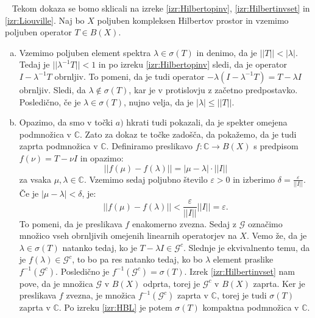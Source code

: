 \documentclass[12pt,a4paper,oneside,fleqn,openany]{book}
\newcommand{\eopf}{\raisebox{0.8ex}{\framebox{}}} %
\newenvironment{dokaz}%
{\noindent{\bf Dokaz.}\ }%
{\hfill\eopf\par\bigskip}%
\newcommand{\C}{\mathbb{C}}
\newcommand{\abs}[1]{\ensuremath{\lvert #1 \rvert}}
\newcommand{\norm}[1]{\abs{\abs{#1}}}
\newcommand{\map}[3]{\ensuremath{{#1}:{#2}\rightarrow{#3}}}
\begin{document}
\begin{dokaz}
	Tekom dokaza se bomo sklicali na izreke \ref{izr:Hilbertopinv}, \ref{izr:Hilbertinvset} in \ref{izr:Liouville}. Naj bo $X$ poljuben kompleksen Hilbertov prostor in vzemimo poljuben operator $T\in B(X)$.
	\begin{enumerate}[a)]
		\item Vzemimo poljuben element spektra $\lambda\in\sigma(T)$ in denimo, da je $\norm{T} < \abs{\lambda}$. Tedaj je $\norm{\lambda^{-1}T} < 1$ in po izreku \ref{izr:Hilbertopinv} sledi, da je operator $I - \lambda^{-1}T$ obrnljiv. To pomeni, da je tudi operator $-\lambda(I - \lambda^{-1}T)= T - \lambda I$ obrnljiv. Sledi, da $\lambda\notin\sigma(T)$, kar je v protislovju z začetno predpostavko. Posledično, če je $\lambda\in \sigma(T)$, nujno velja, da je $\abs{\lambda}\leq \norm{T}$.
		
		\item Opazimo, da smo v točki $a)$ hkrati tudi pokazali, da je spekter omejena podmnožica v $\C$. Zato za dokaz te točke zadošča, da pokažemo, da je tudi zaprta podmnožica v $\C$. Definiramo preslikavo $\map{f}{\C}{B(X)}$ s predpisom $f(\nu) = T - \nu I$ in opazimo: $$\norm{f(\mu) - f(\lambda)} = \abs{\mu - \lambda}\cdot\norm{I}$$ za vsaka $\mu, \lambda \in \C$.
		Vzemimo sedaj poljubno število $\varepsilon>0$ in izberimo $\delta = \frac{\varepsilon}{\norm{I}}$. Če je $\abs{\mu - \lambda}<\delta$, je: $$\norm{f(\mu) - f(\lambda)} < \frac{\varepsilon}{\norm{I}}\norm{I} = \varepsilon.$$ To pomeni, da je preslikava $f$ enakomerno zvezna. 
		Sedaj z $\mathcal{G}$ označimo množico vseh obrnljivih omejenih linearnih operatorjev na $X$. Vemo že, da je $\lambda\in\sigma(T)$ natanko tedaj, ko je $T-\lambda I \in \mathcal{G}^{c}$. Slednje je ekvivalnento temu, da je $f(\lambda)\in\mathcal{G}^{c}$, to bo pa res natanko tedaj, ko bo $\lambda$ element praslike $f^{-1}(\mathcal{G}^{c})$.
		Posledično je $f^{-1}(\mathcal{G}^{c}) = \sigma(T)$. Izrek \ref{izr:Hilbertinvset} nam pove, da je množica $\mathcal{G}$ v $B(X)$ odprta, torej je $\mathcal{G}^{c}$ v $B(X)$ zaprta. Ker je preslikava $f$ zvezna, je množica $f^{-1}(\mathcal{G}^{c})$ zaprta v $\C$, torej je tudi $\sigma(T)$ zaprta v $\C$. Po izreku \ref{izr:HBL} je potem $\sigma(T)$ kompaktna podmnožica v $\C$.
		

\end{enumerate}
\end{dokaz}
\end{document}
